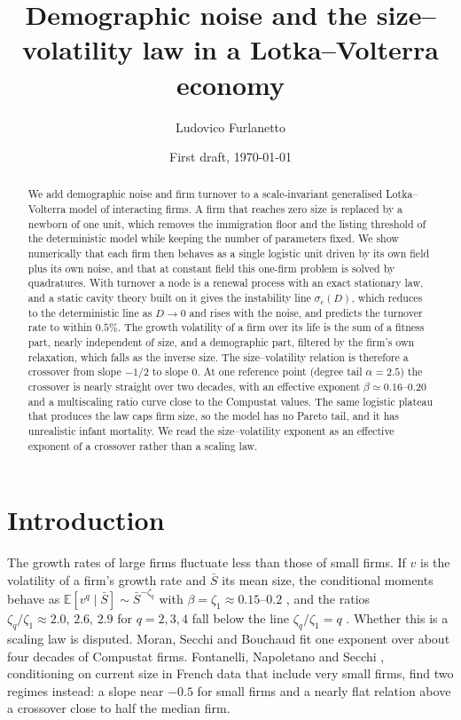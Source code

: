 \documentclass[pre,twocolumn,superscriptaddress,nofootinbib]{revtex4-2}
\newcommand{\E}{\mathbb E}
\newcommand{\Sb}{\bar S}
\begin{document}
\title{Demographic noise and the size--volatility law in a Lotka--Volterra economy}
\author{Ludovico Furlanetto}
\date{First draft, \today}

\begin{abstract}
We add demographic noise and firm turnover to a scale-invariant generalised Lotka--Volterra
model of interacting firms.  A firm that reaches zero size is replaced by a newborn of one unit,
which removes the immigration floor and the listing threshold of the deterministic model while
keeping the number of parameters fixed.  We show numerically that each firm then behaves as a
single logistic unit driven by its own field plus its own noise, and that at constant field this
one-firm problem is solved by quadratures.  With turnover a node is a renewal process with an exact
stationary law, and a static cavity theory built on it gives the instability line $\sigma_c(D)$, which
reduces to the deterministic line as $D\to0$ and rises with the noise, and predicts the turnover rate
to within $0.5\%$.  The growth volatility of a firm over its life is the
sum of a fitness part, nearly independent of size, and a demographic part, filtered by the firm's
own relaxation, which falls as the inverse size.  The size--volatility relation is therefore a
crossover from slope $-1/2$ to slope $0$.  At one reference point (degree tail $\alpha=2.5$)
the crossover is nearly straight over two decades, with an effective exponent
$\beta\simeq0.16$--$0.20$ and a multiscaling ratio curve close to the Compustat values.  The same
logistic plateau that produces the law caps firm size, so the model has no Pareto tail, and it
has unrealistic infant mortality.  We read the size--volatility exponent as an effective exponent
of a crossover rather than a scaling law.
\end{abstract}

\maketitle

\section{Introduction}

The growth rates of large firms fluctuate less than those of small firms.  If $v$ is the
volatility of a firm's growth rate and $\Sb$ its mean size, the conditional moments behave as
$\E[v^q\mid\Sb]\sim\Sb^{-\zeta_q}$ with $\beta=\zeta_1\approx0.15$--$0.2$
\cite{stanley1996,amaral1997,sutton2002}, and the ratios $\zeta_q/\zeta_1\approx2.0,\,2.6,\,2.9$ for
$q=2,3,4$ fall below the line $\zeta_q/\zeta_1=q$ \cite{moran2024}.  Whether this is a scaling law is
disputed.  Moran, Secchi and Bouchaud \cite{moran2024} fit one exponent over about four decades of
Compustat firms.  Fontanelli, Napoletano and Secchi \cite{fontanelli2025}, conditioning on current
size in French data that include very small firms, find two regimes instead: a slope near $-0.5$
for small firms and a nearly flat relation above a crossover close to half the median firm.
\end{document}
